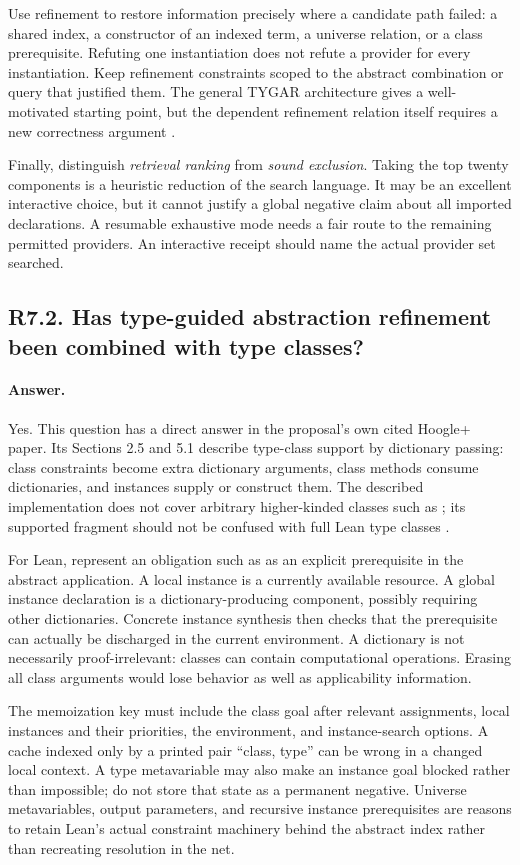 \documentclass[11pt,a4paper]{article}
\newcommand{\code}[1]{\texttt{\detokenize{#1}}}
\newcommand{\answer}{\paragraph{Answer.}}
\theoremstyle{definition}
\theoremstyle{remark}
\begin{document}
Use refinement to restore information precisely where a candidate path failed:
a shared index, a constructor of an indexed term, a universe relation, or a
class prerequisite. Refuting one instantiation does not refute a provider for
every instantiation. Keep refinement constraints scoped to the abstract
combination or query that justified them. The general TYGAR architecture gives
a well-motivated starting point, but the dependent refinement relation itself
requires a new correctness argument \cite{hoogle}.

Finally, distinguish \emph{retrieval ranking} from \emph{sound exclusion}. Taking
the top twenty components is a heuristic reduction of the search language.
It may be an excellent interactive choice, but it cannot justify a global
negative claim about all imported declarations. A resumable exhaustive mode
needs a fair route to the remaining permitted providers. An interactive receipt
should name the actual provider set searched.

\subsection{R7.2. Has type-guided abstraction refinement been combined with type classes?}
\answer Yes. This question has a direct answer in the proposal's own cited
Hoogle+ paper. Its Sections 2.5 and 5.1 describe type-class support by dictionary
passing: class constraints become extra dictionary arguments, class methods
consume dictionaries, and instances supply or construct them. The described
implementation does not cover arbitrary higher-kinded classes such as
\code{Monad}; its supported fragment should not be confused with full Lean type
classes \cite{hoogle}.

For Lean, represent an obligation such as \code{[C A]} as an explicit prerequisite
in the abstract application. A local instance is a currently available
resource. A global instance declaration is a dictionary-producing component,
possibly requiring other dictionaries. Concrete instance synthesis then checks
that the prerequisite can actually be discharged in the current environment.
A dictionary is not necessarily proof-irrelevant: classes can contain
computational operations. Erasing all class arguments would lose behavior as
well as applicability information.

The memoization key must include the class goal after relevant assignments,
local instances and their priorities, the environment, and instance-search
options. A cache indexed only by a printed pair ``class, type'' can be wrong in
a changed local context. A type metavariable may also make an instance goal
blocked rather than impossible; do not store that state as a permanent negative.
Universe metavariables, output parameters, and recursive instance prerequisites
are reasons to retain Lean's actual constraint machinery behind the abstract
index rather than recreating resolution in the net.
\end{document}
